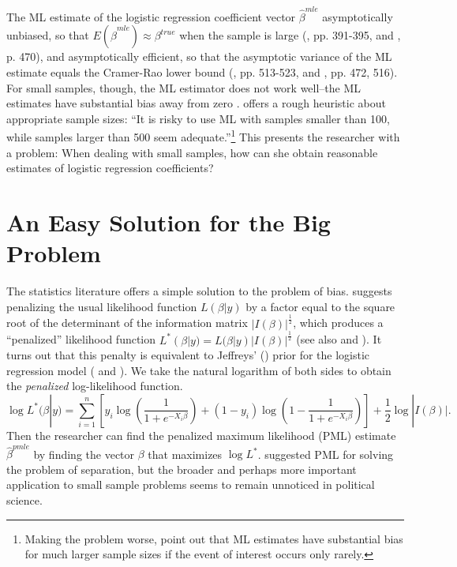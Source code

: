\documentclass[12pt]{article}
\begin{document}
The ML estimate of the logistic regression coefficient vector $\hat{\beta}^{mle}$ asymptotically unbiased, so that $E(\hat{\beta}^{mle}) \approx \beta^{true}$ when the sample is large (\citealt{Wooldridge2002}, pp. 391-395, and \citealt{CasellaBerger2002}, p. 470), and asymptotically efficient, so that the asymptotic variance of the ML estimate equals the Cramer-Rao lower bound (\citealt{Greene2012}, pp. 513-523, and \citealt{CasellaBerger2002}, pp. 472, 516). 
For small samples, though, the ML estimator does not work well--the ML estimates have substantial bias away from zero \citep[pp. 53-54]{Long1997}.
\citet[p. 54]{Long1997} offers a rough heuristic about appropriate sample sizes: ``It is risky to use ML with samples smaller than 100, while samples larger than 500 seem adequate.''\footnote{Making the problem worse, \cite{KingZeng2001} point out that ML estimates have substantial bias for much larger sample sizes if the event of interest occurs only rarely.}
This presents the researcher with a problem: When dealing with small samples, how can she obtain reasonable estimates of logistic regression coefficients?

\section*{An Easy Solution for the Big Problem}

The statistics literature offers a simple solution to the problem of bias.
\cite{Firth1993} suggests penalizing the usual likelihood function $L(\beta | y)$ by a factor equal to the square root of the determinant of the information matrix $|I(\beta)|^\frac{1}{2}$, which produces a ``penalized'' likelihood function $L^*(\beta | y) = L(\beta | y)|I(\beta)|^\frac{1}{2}$ (see also \citealt{KosmidisFirth2009} and \citealt{Kosmidis2014}).
It turns out that this penalty is equivalent to Jeffreys' (\citeyear{Jeffreys1946}) prior for the logistic regression model (\citealt{Firth1993} and \citealt{Poirier1994}).
We take the natural logarithm of both sides to obtain the \textit{penalized} log-likelihood function.
\begin{equation}\nonumber
\log L^*(\beta | y) = \displaystyle \sum_{i = 1}^n \left[y_i \log \left( \dfrac{1}{1 + e^{-X_i\beta}}\right) + (1 - y_i) \log \left(1 - \dfrac{1}{1 + e^{-X_i\beta}}\right)\right] + \dfrac{1}{2} \log |I(\beta)|.
\end{equation}
Then the researcher can find the penalized maximum likelihood (PML) estimate $\hat{\beta}^{pmle}$ by finding the vector $\beta$ that maximizes $\log L^*$.
\cite{Zorn2005} suggested PML for solving the problem of separation,
but the broader and perhaps more important application to small sample problems seems to remain unnoticed in political science.
\end{document}

